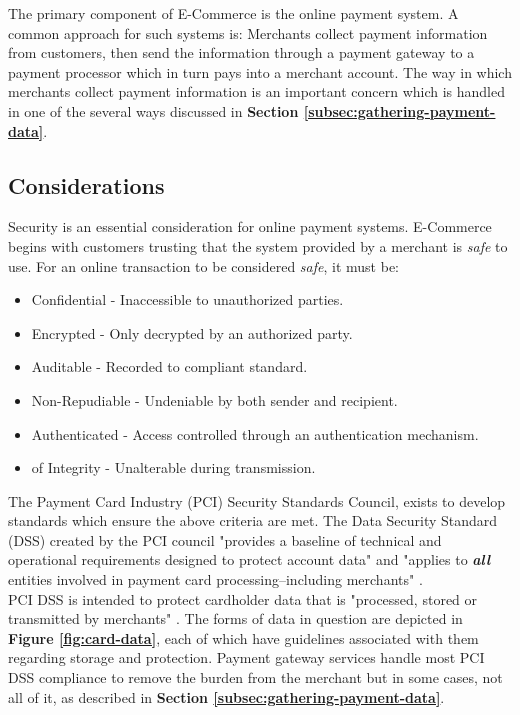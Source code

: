 The primary component of E-Commerce is the online payment system. A common approach for such systems is: Merchants collect payment information from customers, then send the information through a payment gateway to a payment processor which in turn pays into a merchant account. The way in which merchants collect payment information is an important concern which is handled in one of the several ways discussed in \textbf{Section \ref{subsec:gathering-payment-data}}.

\subsection{Considerations}
\label{subsec:considerations}

Security is an essential consideration for online payment systems. E-Commerce begins with customers trusting that the system provided by a merchant is \textit{safe} to use. For an online transaction to be considered \textit{safe}, it must be:

\begin{itemize}
	  \item Confidential - Inaccessible to unauthorized parties.
    \item Encrypted - Only decrypted by an authorized party.
    \item Auditable - Recorded to compliant standard.
    \item Non-Repudiable - Undeniable by both sender and recipient.
    \item Authenticated - Access controlled through an authentication mechanism.
    \item of Integrity - Unalterable during transmission.
\end{itemize}

The Payment Card Industry (PCI) Security Standards Council, exists to develop standards which ensure the above criteria are met. The Data Security Standard (DSS) created by the PCI council "provides a baseline of technical and operational requirements designed to protect account data" and "applies to \textit{\textbf{all}} entities involved in payment card processing--including merchants" \cite{PCI-DSS}.\\

PCI DSS is intended to protect cardholder data that is "processed, stored or transmitted by merchants" \cite{PCI-DSS}. The forms of data in question are depicted in \textbf{Figure \ref{fig:card-data}}, each of which have guidelines associated with them regarding storage and protection. Payment gateway services handle most PCI DSS compliance to remove the burden from the merchant but in some cases, not all of it, as described in \textbf{Section \ref{subsec:gathering-payment-data}}.

